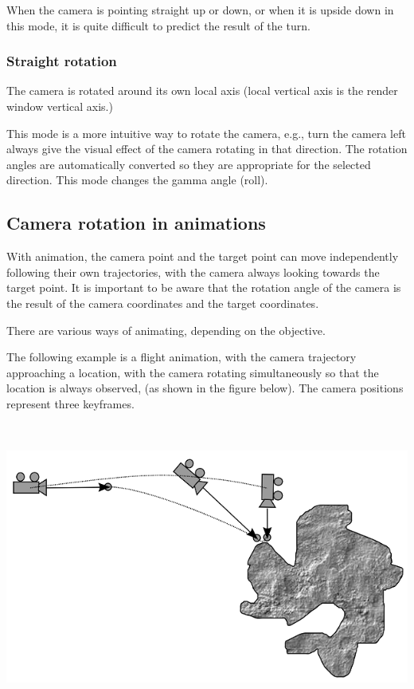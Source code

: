 When the camera is pointing straight up or down, or when it is upside down in
this mode, it is quite difficult to predict the result of the turn.

\subsubsection{Straight rotation}\label{straight-rotation}

The camera is rotated around its own local axis (local vertical axis is the
render window vertical axis.)

This mode is a more intuitive way to rotate the camera, e.g., turn the camera
left always give the visual effect of the camera rotating in that direction. The
rotation angles are automatically converted so they are appropriate for the
selected direction. This mode changes the gamma angle (roll).

\subsection{Camera rotation in animations}\label{camera-rotation-in-animations}

With animation, the camera point and the target point can move independently
following their own trajectories, with the camera always looking towards the
target point. It is important to be aware that the rotation angle of the camera
is the result of the camera coordinates and the target coordinates.

There are various ways of animating, depending on the objective.

The following example is a flight animation, with the camera trajectory
approaching a location, with the camera rotating simultaneously so that the
location is always observed, (as shown in the figure below). The camera
positions represent three keyframes.

\includegraphics[width=6.52292in,height=3.75556in]{img/manual/media/image18.png}

